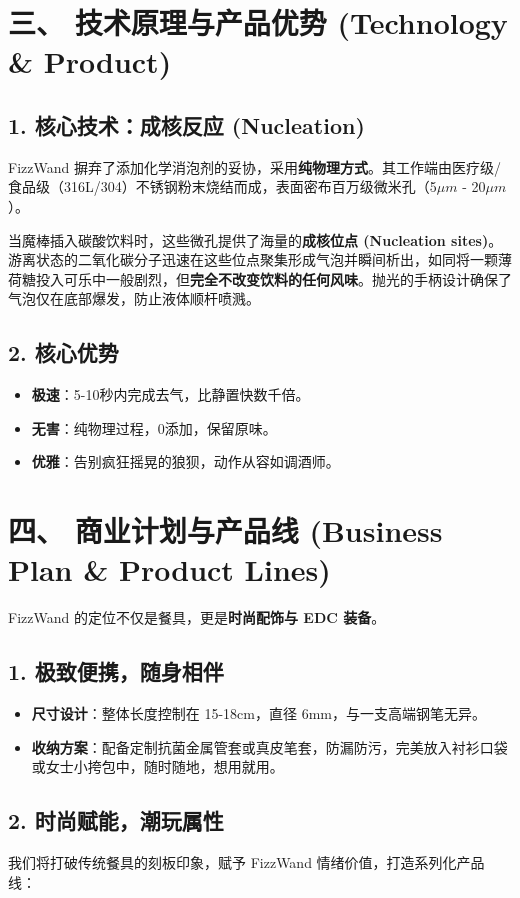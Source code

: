 \documentclass[a4paper,12pt]{ctexart}
\begin{document}
\section{三、 技术原理与产品优势 (Technology \& Product)}
\subsection{1. 核心技术：成核反应 (Nucleation)}
FizzWand 摒弃了添加化学消泡剂的妥协，采用\textbf{纯物理方式}。其工作端由医疗级/食品级（316L/304）不锈钢粉末烧结而成，表面密布百万级微米孔（5$\mu m$ - 20$\mu m$）。

当魔棒插入碳酸饮料时，这些微孔提供了海量的\textbf{成核位点 (Nucleation sites)}。游离状态的二氧化碳分子迅速在这些位点聚集形成气泡并瞬间析出，如同将一颗薄荷糖投入可乐中一般剧烈，但\textbf{完全不改变饮料的任何风味}。抛光的手柄设计确保了气泡仅在底部爆发，防止液体顺杆喷溅。

\subsection{2. 核心优势}
\begin{itemize}
    \item \textbf{极速}：5-10秒内完成去气，比静置快数千倍。
    \item \textbf{无害}：纯物理过程，0添加，保留原味。
    \item \textbf{优雅}：告别疯狂摇晃的狼狈，动作从容如调酒师。
\end{itemize}

\section{四、 商业计划与产品线 (Business Plan \& Product Lines)}
FizzWand 的定位不仅是餐具，更是\textbf{时尚配饰与 EDC 装备}。

\subsection{1. 极致便携，随身相伴}
\begin{itemize}
    \item \textbf{尺寸设计}：整体长度控制在 15-18cm，直径 6mm，与一支高端钢笔无异。
    \item \textbf{收纳方案}：配备定制抗菌金属管套或真皮笔套，防漏防污，完美放入衬衫口袋或女士小挎包中，随时随地，想用就用。
\end{itemize}

\subsection{2. 时尚赋能，潮玩属性}
我们将打破传统餐具的刻板印象，赋予 FizzWand 情绪价值，打造系列化产品线：
\end{document}
